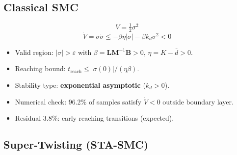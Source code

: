 \documentclass[10pt, a4paper]{article}
\begin{document}
\subsection{Classical SMC}

\begin{equation}
  V = \tfrac{1}{2}\sigma^2
  \label{eq:lyap_classical}
\end{equation}
\begin{equation}
  \dot{V} = \sigma\dot{\sigma}
    \leq -\beta\eta|\sigma| - \beta k_d\sigma^2 < 0
  \label{eq:lyap_classical_dot}
\end{equation}
\begin{itemize}[leftmargin=1.5em,itemsep=0.2em]
  \item Valid region: $|\sigma|>\varepsilon$ with
  $\beta=\mathbf{L}\mathbf{M}^{-1}\mathbf{B}>0$, $\eta=K-\bar{d}>0$.
  \item Reaching bound: $t_\text{reach} \le |\sigma(0)|/(\eta\beta)$.
  \item Stability type: \textbf{exponential asymptotic} ($k_d>0$).
  \item Numerical check: 96.2\% of samples satisfy $\dot{V}<0$ outside boundary layer.
  \item Residual 3.8\%: early reaching transitions (expected).
\end{itemize}

\subsection{Super-Twisting (STA-SMC)}
\end{document}

